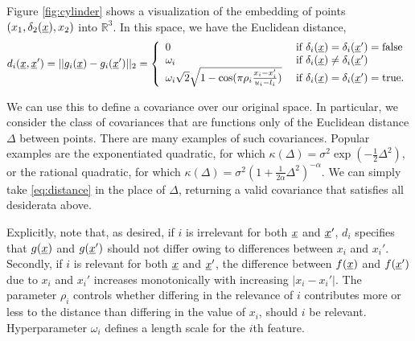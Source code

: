 \documentclass{article}
\newcommand{\vect}[1]{\underline{\smash{#1}}}
\renewcommand{\v}[1]{\vect{#1}}
\newcommand{\reals}{\mathds{R}}
\newcommand{\br}{}%
\newcommand{\note}[1]{}
\newcommand{\embeddingletter}{g}
\begin{document}
Figure \ref{fig:cylinder} shows a visualization of the embedding of points $(x_1, \delta_2(\v{x}), x_2)$ into $\reals^3$. 
%
In this space, we have the Euclidean distance,
%
\begin{equation}
d\br_i(\v{x}, \v{x}') = ||\embeddingletter_i\br(\v{x})-\embeddingletter_i\br(\v{x}')||_2 =\left\{\begin{array}{ll}
0 & \textrm{ if } \delta_i(\v{x}) = \delta_i(\v{x}') = \textrm{false}\\
\omega_i & \textrm{ if } \delta_i(\v{x}) \neq \delta_i(\v{x}')\\
\omega_i \sqrt{2} \sqrt{1 - \cos(\pi\rho_i \frac{x_i-x_i'}{u_i-l_i})} & \textrm{ if } \delta_i(\v{x}) = \delta_i(\v{x}') = \textrm{true}. \end{array}\right.
\label{eq:distance}
\end{equation}



We can use this to define a covariance over our original space. In particular, we consider the class of covariances that are functions only of the Euclidean distance $\Delta$ between points. There are many examples of such covariances. Popular examples are the exponentiated quadratic, for which $\kappa(\Delta) = \sigma^2 \exp(-\frac{1}{2} \Delta^2)$, or the rational quadratic, for which $\kappa(\Delta) = \sigma^2 (1+\frac{1}{2\alpha} \Delta^2)^{-\alpha}$. We can simply take \eqref{eq:distance} in the place of $\Delta$, returning a valid covariance that satisfies all desiderata above. 


Explicitly, note that, as desired, if $i$ is irrelevant for both $\v{x}$ and $\v{x}'$, $d\br_i$ specifies that $g(\v{x})$ and $g(\v{x}')$ should not differ owing to differences between $x_i$ and $x_i'$. Secondly, if $i$ is relevant for both $\v{x}$ and $\v{x}'$, the difference between $f(\v{x})$ and $f(\v{x}')$ due to $x_i$ and $x_i'$ increases monotonically with increasing $\left|x_i-x_i'\right|$. The parameter $\rho_i$ controls whether differing in the relevance of $i$ contributes more or less to the distance than differing in the value of $x_i$, should $i$ be relevant. 
%
%
%
%
Hyperparameter $\omega_i$ defines a length scale for the $i$th feature. 
\end{document}
